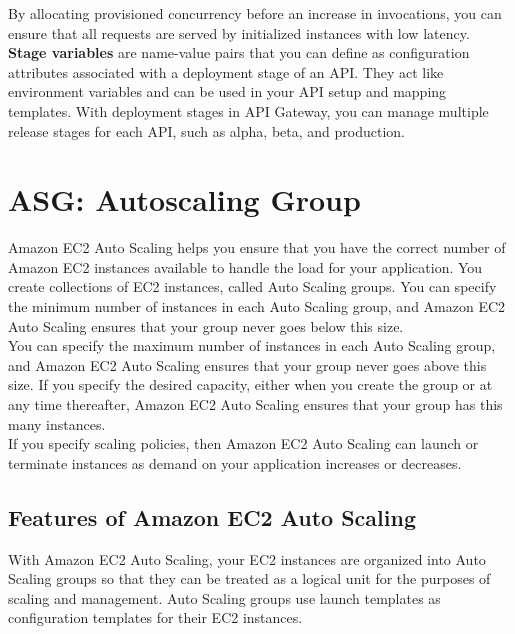 \documentclass[12pt, letterpaper, twoside]{article}
\begin{document}
By allocating provisioned concurrency before an increase in invocations, you can ensure that all requests are served by 
initialized instances with low latency.\\ 

\textbf{Stage variables} are name-value pairs that you can define as configuration attributes associated with a deployment stage of an API. 
They act like environment variables and can be used in your API setup and mapping templates. With deployment stages in API Gateway, 
you can manage multiple release stages for each API, such as alpha, beta, and production.\\


\section{ASG: Autoscaling Group}
Amazon EC2 Auto Scaling helps you ensure that you have the correct number of Amazon EC2 instances available to 
handle the load for your application. You create collections of EC2 instances, called Auto Scaling groups. You 
can specify the minimum number of instances in each Auto Scaling group, and Amazon EC2 Auto Scaling ensures that 
your group never goes below this size.\\
You can specify the maximum number of instances in each Auto Scaling group, and Amazon EC2 Auto Scaling ensures 
that your group never goes above this size. If you specify the desired capacity, either when you create the group 
or at any time thereafter, Amazon EC2 Auto Scaling ensures that your group has this many instances.\\
If you specify scaling policies, then Amazon EC2 Auto Scaling can launch or terminate instances as demand on your 
application increases or decreases.\\

\subsection{Features of Amazon EC2 Auto Scaling}
With Amazon EC2 Auto Scaling, your EC2 instances are organized into Auto Scaling groups so that they can be 
treated as a logical unit for the purposes of scaling and management. Auto Scaling groups use launch templates 
as configuration templates for their EC2 instances.\\
\end{document}
